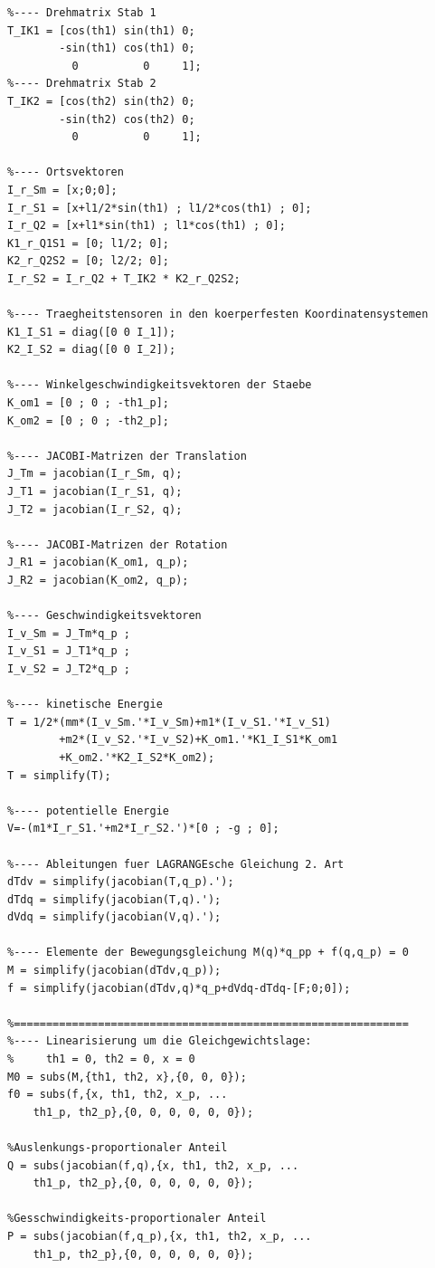 \documentclass[a4paper, 10pt]{report}
\begin{document}
\begin{lstlisting}
%---- Drehmatrix Stab 1
T_IK1 = [cos(th1) sin(th1) 0;
        -sin(th1) cos(th1) 0;
          0          0     1];
%---- Drehmatrix Stab 2
T_IK2 = [cos(th2) sin(th2) 0;
        -sin(th2) cos(th2) 0;
          0          0     1];

%---- Ortsvektoren
I_r_Sm = [x;0;0];
I_r_S1 = [x+l1/2*sin(th1) ; l1/2*cos(th1) ; 0];
I_r_Q2 = [x+l1*sin(th1) ; l1*cos(th1) ; 0];
K1_r_Q1S1 = [0; l1/2; 0];
K2_r_Q2S2 = [0; l2/2; 0];
I_r_S2 = I_r_Q2 + T_IK2 * K2_r_Q2S2;

%---- Traegheitstensoren in den koerperfesten Koordinatensystemen
K1_I_S1 = diag([0 0 I_1]);
K2_I_S2 = diag([0 0 I_2]);

%---- Winkelgeschwindigkeitsvektoren der Staebe
K_om1 = [0 ; 0 ; -th1_p];
K_om2 = [0 ; 0 ; -th2_p];

%---- JACOBI-Matrizen der Translation
J_Tm = jacobian(I_r_Sm, q);
J_T1 = jacobian(I_r_S1, q);
J_T2 = jacobian(I_r_S2, q);

%---- JACOBI-Matrizen der Rotation
J_R1 = jacobian(K_om1, q_p);
J_R2 = jacobian(K_om2, q_p);

%---- Geschwindigkeitsvektoren
I_v_Sm = J_Tm*q_p ;
I_v_S1 = J_T1*q_p ; 
I_v_S2 = J_T2*q_p ;

%---- kinetische Energie
T = 1/2*(mm*(I_v_Sm.'*I_v_Sm)+m1*(I_v_S1.'*I_v_S1)
		+m2*(I_v_S2.'*I_v_S2)+K_om1.'*K1_I_S1*K_om1
		+K_om2.'*K2_I_S2*K_om2);        
T = simplify(T);

%---- potentielle Energie
V=-(m1*I_r_S1.'+m2*I_r_S2.')*[0 ; -g ; 0];

%---- Ableitungen fuer LAGRANGEsche Gleichung 2. Art
dTdv = simplify(jacobian(T,q_p).');
dTdq = simplify(jacobian(T,q).');
dVdq = simplify(jacobian(V,q).');

%---- Elemente der Bewegungsgleichung M(q)*q_pp + f(q,q_p) = 0
M = simplify(jacobian(dTdv,q_p));
f = simplify(jacobian(dTdv,q)*q_p+dVdq-dTdq-[F;0;0]);

%=============================================================
%---- Linearisierung um die Gleichgewichtslage:
%     th1 = 0, th2 = 0, x = 0
M0 = subs(M,{th1, th2, x},{0, 0, 0});
f0 = subs(f,{x, th1, th2, x_p, ...
    th1_p, th2_p},{0, 0, 0, 0, 0, 0});
    
%Auslenkungs-proportionaler Anteil
Q = subs(jacobian(f,q),{x, th1, th2, x_p, ...
    th1_p, th2_p},{0, 0, 0, 0, 0, 0});
    
%Gesschwindigkeits-proportionaler Anteil
P = subs(jacobian(f,q_p),{x, th1, th2, x_p, ...
    th1_p, th2_p},{0, 0, 0, 0, 0, 0});
\end{lstlisting}
\end{document}
